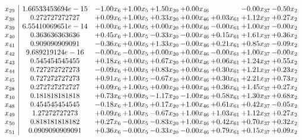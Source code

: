 \documentclass[8pt]{article}
\begin{document}
\[\begin{array}{c| c c@{\hskip 2pt} c@{\hskip 2pt} c@{\hskip 2pt} c@{\hskip 2pt} c@{\hskip 2pt} c@{\hskip 2pt} c@{\hskip 2pt} }
 x_{29}   &  1.66533453694e-15 & -1.00 x_{6} & +  1.00 x_{5} & +  1.50 x_{20} & +  0.00 x_{46} &   & -0.00 x_{37} & -0.50 x_{2}\\
 x_{38}   &  0.272727272727 & +  0.09 x_{6} & +  1.00 x_{5} & +  0.33 x_{20} & +  0.00 x_{46} & +  0.03 x_{61} & +  1.12 x_{37} & +  0.27 x_{2}\\
 x_{39}   &  6.55410069651e-14 & +  0.00 x_{6} & +  1.00 x_{5} & +  0.00 x_{20} & +  0.00 x_{46} & -0.00 x_{61} & +  1.00 x_{37} & -0.00 x_{2}\\
 x_{40}   &  0.363636363636 & +  0.45 x_{6} & +  1.00 x_{5} & -0.33 x_{20} & -0.00 x_{46} & +  0.15 x_{61} & +  1.61 x_{37} & +  0.36 x_{2}\\
 x_{41}   &  0.909090909091 & -0.36 x_{6} & +  0.00 x_{5} & +  1.33 x_{20} & -0.00 x_{46} & +  0.21 x_{61} & +  0.85 x_{37} & -0.09 x_{2}\\
 x_{42}   &  9.689219124e-16 & -0.00 x_{6} & -0.00 x_{5} & +  0.00 x_{20} & +  0.00 x_{46} & -0.00 x_{61} & +  1.00 x_{37} & -0.00 x_{2}\\
 x_{43}   &  0.545454545455 & +  0.18 x_{6} & +  0.00 x_{5} & +  0.67 x_{20} & +  0.00 x_{46} & +  0.06 x_{61} & +  1.24 x_{37} & +  0.55 x_{2}\\
 x_{44}   &  0.727272727273 & -0.09 x_{6} & +  0.00 x_{5} & +  0.83 x_{20} & +  0.00 x_{46} & +  0.30 x_{61} & +  1.21 x_{37} & +  0.23 x_{2}\\
 x_{45}   &  0.727272727273 & +  0.91 x_{6} & +  1.00 x_{5} & -0.67 x_{20} & +  0.00 x_{46} & +  0.30 x_{61} & +  2.21 x_{37} & +  0.73 x_{2}\\
 x_{28}   &  0.272727272727 & +  0.09 x_{6} & +  1.00 x_{5} & +  0.00 x_{20} & +  0.00 x_{46} & +  0.36 x_{61} & +  1.45 x_{37} & +  0.27 x_{2}\\
 x_{10}   &  0.181818181818 & +  0.73 x_{6} & +  0.00 x_{5} & -1.17 x_{20} & -1.00 x_{46} & +  0.58 x_{61} & +  1.30 x_{37} & +  0.68 x_{2}\\
 x_{48}   &  0.454545454545 & -0.18 x_{6} & +  1.00 x_{5} & +  0.17 x_{20} & +  1.00 x_{46} & +  0.61 x_{61} & +  0.42 x_{37} & -0.05 x_{2}\\
 x_{49}   &  1.27272727273 & +  0.09 x_{6} & +  1.00 x_{5} & -0.67 x_{20} & +  1.00 x_{46} & +  1.03 x_{61} & +  1.12 x_{37} & +  0.27 x_{2}\\
 x_{50}   &  0.818181818182 & +  0.27 x_{6} & -0.00 x_{5} & -0.83 x_{20} & +  1.00 x_{46} & +  0.42 x_{61} & +  0.70 x_{37} & +  0.32 x_{2}\\
 x_{51}   &  0.0909090909091 & +  0.36 x_{6} & -0.00 x_{5} & -0.33 x_{20} & -0.00 x_{46} & +  0.79 x_{61} & +  0.15 x_{37} & +  0.09 x_{2}\\

\end{array}\]
\end{document}
